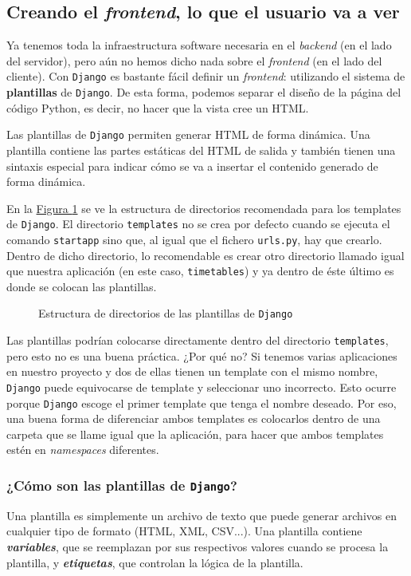 \subsection{Creando el \textit{frontend}, lo que el usuario va a ver}
Ya tenemos toda la infraestructura software necesaria en el \textit{backend} (en el lado del servidor), pero aún no hemos dicho nada sobre el \textit{frontend} (en el lado del cliente). Con \texttt{Django} es bastante fácil definir un \textit{frontend}: utilizando el sistema de  \textbf{plantillas} de \texttt{Django}. De esta forma, podemos separar el diseño de la página del código Python, es decir, no hacer que la vista cree un HTML.

Las plantillas de \texttt{Django} permiten generar HTML de forma dinámica. Una plantilla contiene las partes estáticas del HTML de salida y también tienen una sintaxis especial para indicar cómo se va a insertar el contenido generado de forma dinámica. 


En la \hyperref[djangotemplates]{Figura \ref*{djangotemplates}} se ve la estructura de directorios recomendada para los templates de \texttt{Django}. El directorio \texttt{templates} no se crea por defecto cuando se ejecuta el comando \texttt{startapp} sino que, al igual que el fichero \texttt{urls.py}, hay que crearlo. Dentro de dicho directorio, lo recomendable es crear otro directorio llamado igual que nuestra aplicación (en este caso, \texttt{timetables}) y ya dentro de éste último es donde se colocan las plantillas. 

\begin{figure}
\centering
\scalebox{.7}{}
\caption{Estructura de directorios de las plantillas de \texttt{Django}}
\label{djangotemplates}
\end{figure}

Las plantillas podrían colocarse directamente dentro del directorio \texttt{templates}, pero esto no es una buena práctica. ¿Por qué no? Si tenemos varias aplicaciones en nuestro proyecto y dos de ellas tienen un template con el mismo nombre, \texttt{Django} puede equivocarse de template y seleccionar uno incorrecto. Esto ocurre porque \texttt{Django} escoge el primer template que tenga el nombre deseado. Por eso, una buena forma de diferenciar ambos templates es colocarlos dentro de una carpeta que se llame igual que la aplicación, para hacer que ambos templates estén en \textit{namespaces} diferentes.

\subsubsection{¿Cómo son las plantillas de \texttt{Django}?} 
Una plantilla es simplemente un archivo de texto que puede generar archivos en cualquier tipo de formato (HTML, XML, CSV...). Una plantilla contiene \textbf{\textit{variables}}, que se reemplazan por sus respectivos valores cuando se procesa la plantilla, y \textbf{\textit{etiquetas}}, que controlan la lógica de la plantilla.

